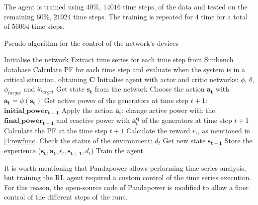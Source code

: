 The agent is trained using $40\%$, $14016$ time steps, of the data and tested on the remaining $60\%$, $21024$ time steps. The training is repeated for $4$ time for a total of $56064$ time steps.\\

\begin{algorithm}[H]
  \caption{Pseudo-algorithm for the control of the network's devices}
  \begin{algorithmic}
    \STATE Initialise the network
    \STATE Extract time series for each time step from Simbench database
    \STATE Calculate \gls{PF} for each time step and evaluate when the system is in a critical situation, obtaining $\textbf{C}$
    \STATE Initialise agent with actor and critic networks: $\phi$, $\theta$, $\phi_{target}$ and $\theta_{target}$ 
            \STATE Get state $\mathbf{s_t}$ from the network
            \STATE Choose the action $\mathbf{a_t}$ with $\mathbf{a_t}=\phi(\mathbf{s_t})$
            \STATE Get active power of the generators at time step $t+1$: $\mathbf{initial\_power_{t+1}}$
            \STATE Apply the action $\mathbf{a_t}$: change active power with the $\mathbf{final\_power_{t+1}}$ and reactive power with $\mathbf{a^q_t}$ of the generators at time step $t+1$
            \STATE Calculate the \gls{PF} at the time step $t+1$
            \STATE Calculate the reward $r_t$, as mentioned in \ref{4:rewfunc}
            \STATE Check the status of the environment: $d_t$
            \STATE Get new state $\mathbf{s_{t+1}}$
            \STATE Store the experience ($\mathbf{s_t}, \mathbf{a_t}, r_t, \mathbf{s_{t+1}}, d_t$)
            \STATE Train the agent
        \ENDFOR
    \ENDFOR
  \end{algorithmic}
\end{algorithm}

It is worth mentioning that Pandapower allows performing time series analysis, but training the \gls{RL} agent required a custom control of the time series execution. For this reason, the open-source code of Pandapower is modified to allow a finer control of the different steps of the runs.\\
